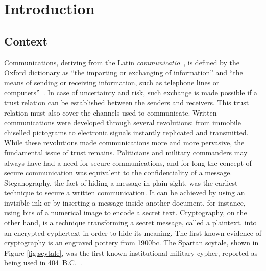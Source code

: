 \chapter*{Introduction}
\label{introduction}
\glsresetall
\section*{Context}
\label{introduction.context}

Communications, deriving from the Latin \textit{communicatio}~\cite{communicatio}, is defined by the Oxford dictionary as ``the imparting or exchanging of information'' and ``the means of sending or receiving information, such as telephone lines or computers''~\cite{communication}.
In case of uncertainty and risk, such exchange is made possible if a trust relation can be established between the senders and receivers.
This trust relation must also cover the channels used to communicate.
Written communications were developed through several revolutions: from immobile chiselled pictograms to electronic signals instantly replicated and transmitted.
While these revolutions made communications more and more pervasive, the fundamental issue of trust remains.
Politicians and military commanders may always have had a need for secure communications, and for long the concept of secure communication was equivalent to the confidentiality of a message. 
Steganography, the fact of hiding a message in plain sight, was the earliest technique to secure a written communication. 
It can be achieved by using an invisible ink or by inserting a message inside another document, for instance, using bits of a numerical image to encode a secret text.
Cryptography, on the other hand, is a technique transforming a secret message, called a plaintext, into an encrypted cyphertext in order to hide its meaning.
The first known evidence of cryptography is an engraved pottery from 1900bc.
The Spartan scytale, shown in Figure \ref{fig:scytale}, was the first known institutional military cypher, reported as being used in 404~B.C.~\cite{singh2000code}.


